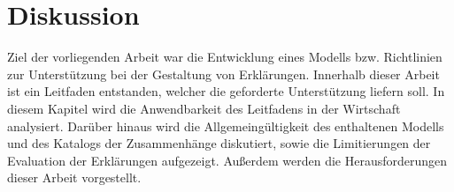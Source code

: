 \chapter{Diskussion}

Ziel der vorliegenden Arbeit war die Entwicklung eines Modells bzw. Richtlinien zur Unterstützung bei der Gestaltung von Erklärungen. Innerhalb dieser Arbeit ist ein Leitfaden entstanden, welcher die geforderte Unterstützung liefern soll. In diesem Kapitel wird die Anwendbarkeit des Leitfadens in der Wirtschaft analysiert. Darüber hinaus wird die Allgemeingültigkeit des enthaltenen Modells und des Katalogs der Zusammenhänge diskutiert, sowie die Limitierungen der Evaluation der Erklärungen aufgezeigt. Außerdem werden die Herausforderungen dieser Arbeit vorgestellt.





